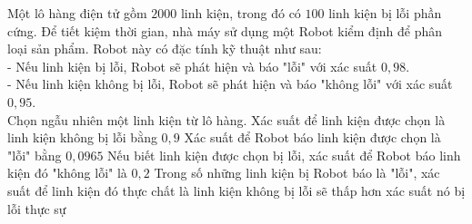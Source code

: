 \begin{ex}%
	Một lô hàng điện tử gồm $2000$ linh kiện, trong đó có $100$ linh kiện bị lỗi phần cứng. Để tiết kiệm thời gian, nhà máy sử dụng một Robot kiểm định để phân loại sản phẩm. Robot này có đặc tính kỹ thuật như sau:\\
	- Nếu linh kiện bị lỗi, Robot sẽ phát hiện và báo "lỗi" với xác suất $0,98$.\\
	- Nếu linh kiện không bị lỗi, Robot sẽ phát hiện và báo "không lỗi" với xác suất $0,95$.\\
	Chọn ngẫu nhiên một linh kiện từ lô hàng.
	\choiceTF
	{Xác suất để linh kiện được chọn là linh kiện không bị lỗi bằng $0,9$}
	{\True Xác suất để Robot báo linh kiện được chọn là "lỗi" bằng $0,0965$}
	{Nếu biết linh kiện được chọn bị lỗi, xác suất để Robot báo linh kiện đó "không lỗi" là $0,2$}
	{\True Trong số những linh kiện bị Robot báo là "lỗi", xác suất để linh kiện đó thực chất là linh kiện không bị lỗi sẽ thấp hơn xác suất nó bị lỗi thực sự}
\end{ex}






